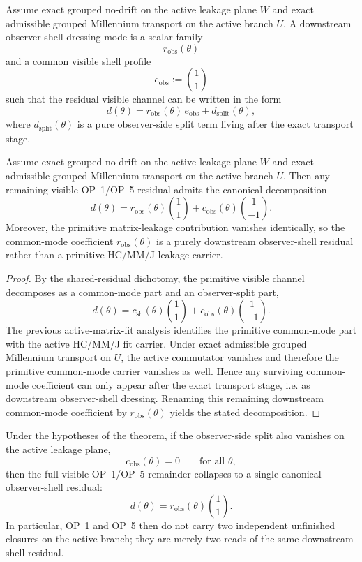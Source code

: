\begin{definition}
Assume exact grouped no-drift on the active leakage plane $W$ and exact admissible grouped Millennium transport on the active branch $U$. A downstream observer-shell dressing mode is a scalar family
\[
  r_{\mathrm{obs}}(\theta)
\]
and a common visible shell profile
\[
  e_{\mathrm{obs}}:=\binom{1}{1}
\]
such that the residual visible channel can be written in the form
\[
  d(\theta)=r_{\mathrm{obs}}(\theta)\,e_{\mathrm{obs}}+d_{\mathrm{split}}(\theta),
\]
where $d_{\mathrm{split}}(\theta)$ is a pure observer-side split term living after the exact transport stage.
\end{definition}

\begin{theorem}
Assume exact grouped no-drift on the active leakage plane $W$ and exact admissible grouped Millennium transport on the active branch $U$. Then any remaining visible OP~1/OP~5 residual admits the canonical decomposition
\[
  d(\theta)=r_{\mathrm{obs}}(\theta)\binom{1}{1}+c_{\mathrm{obs}}(\theta)\binom{1}{-1}.
\]
Moreover, the primitive matrix-leakage contribution vanishes identically, so the common-mode coefficient $r_{\mathrm{obs}}(\theta)$ is a purely downstream observer-shell residual rather than a primitive HC/MM/J leakage carrier.
\end{theorem}

\begin{proof}
By the shared-residual dichotomy, the primitive visible channel decomposes as a common-mode part and an observer-split part,
\[
  d(\theta)=c_{\mathrm{sh}}(\theta)\binom{1}{1}+c_{\mathrm{obs}}(\theta)\binom{1}{-1}.
\]
The previous active-matrix-fit analysis identifies the primitive common-mode part with the active HC/MM/J fit carrier. Under exact admissible grouped Millennium transport on $U$, the active commutator vanishes and therefore the primitive common-mode carrier vanishes as well. Hence any surviving common-mode coefficient can only appear after the exact transport stage, i.e. as downstream observer-shell dressing. Renaming this remaining downstream common-mode coefficient by $r_{\mathrm{obs}}(\theta)$ yields the stated decomposition.
\end{proof}

\begin{corollary}
Under the hypotheses of the theorem, if the observer-side split also vanishes on the active leakage plane,
\[
  c_{\mathrm{obs}}(\theta)=0\qquad\text{for all }\theta,
\]
then the full visible OP~1/OP~5 remainder collapses to a single canonical observer-shell residual:
\[
  d(\theta)=r_{\mathrm{obs}}(\theta)\binom{1}{1}.
\]
In particular, OP~1 and OP~5 then do not carry two independent unfinished closures on the active branch; they are merely two reads of the same downstream shell residual.
\end{corollary}

